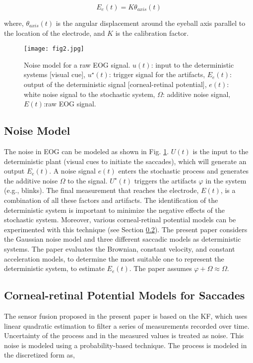 \documentclass[transmag]{IEEEtran}
\begin{document}
\begin{equation}
E_e(t) = K\theta_{axis}(t)
\end{equation}

where, $\theta_{axis}(t)$ is the angular displacement around the eyeball axis parallel to the location of the electrode, and $K$ is the calibration factor. 

\begin{figure}
	\centerline{\texttt{[image: fig2.jpg]}}
	\caption{Noise model for a raw EOG signal. $u(t)$: input to the deterministic systems [visual cue], $u^{\star} (t)$: trigger signal for the artifacts, $E_e (t)$: output of the deterministic signal [corneal-retinal potential], $e(t)$: white noise signal to the stochastic system, $\Omega$: additive noise signal, $E(t)$:raw EOG signal. }
	\label{fig2}
\end{figure} 

\subsection{Noise Model}
The noise in EOG can be modeled as shown in Fig. \ref{fig2}. $U(t)$ is the input to the deterministic plant (visual cues to initiate the saccades), which will generate an output $E_e(t)$. A noise signal $e(t)$ enters the stochastic process and generates the additive noise $\Omega$ to the signal. $U^\star(t)$ triggers the artifacts $\varphi$ in the system (e.g., blinks). The final measurement that reaches the electrode, $E(t)$, is a combination of all these factors and artifacts. The identification of the deterministic system is important to minimize the negative effects of the stochastic system. Moreover, various corneal-retinal potential models can be experimented with this technique (see Section \ref{3C}). The present paper considers the Gaussian noise model and three different saccadic models as deterministic systems. The paper evaluates the Brownian, constant velocity, and constant acceleration models, to determine the most suitable one to represent the deterministic system, to estimate $E_e(t)$. The paper assumes $\varphi + \Omega \approx \Omega$.


\subsection{Corneal-retinal Potential Models for Saccades}
\label{3C}

The sensor fusion proposed in the present paper is based on the KF, which uses linear quadratic estimation to filter a series of measurements recorded over time. Uncertainty of the process and in the measured values is treated as noise. This noise is modeled using a probability-based technique. The process is modeled in the discretized form as,  
\end{document}

